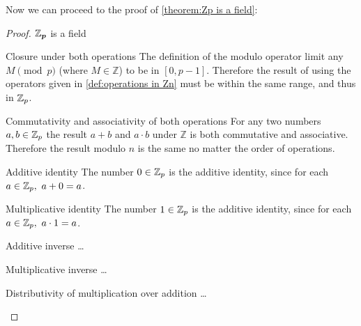 Now we can proceed to the proof of \autoref{theorem:Zp is a field}:

\begin{proof}{$\bm{\mathbb{Z}_{p}}$ is a field}{}
	\begin{descitemize}
	\item[Closure under both operations] The definition of the modulo operator limit any $M\pmod{p}$ (where $M\in\mathbb{Z}$) to be in $[0,p-1]$. Therefore the result of using the operators given in \autoref{def:operations in Zn} must be within the same range, and thus in $\mathbb{Z}_{p}$.

	\item[Commutativity and associativity of both operations] For any two numbers $a,b\in\mathbb{Z}_{p}$ the result $a+b$ and $a\cdot b$ under $\mathbb{Z}$ is both commutative and associative. Therefore the result modulo $n$ is the same no matter the order of operations.

	\item[Additive identity] The number $0\in\mathbb{Z}_{p}$ is the additive identity, since for each $a\in\mathbb{Z}_{p},\ a+0=a$.
	
	\item[Multiplicative identity] The number $1\in\mathbb{Z}_{p}$ is the additive identity, since for each $a\in\mathbb{Z}_{p},\ a\cdot1=a$.

	\item[Additive inverse] \ldots
	
	\item[Multiplicative inverse] \ldots
	
	\item[Distributivity of multiplication over addition] \ldots
	\end{descitemize}
\end{proof}

\Blindtext
